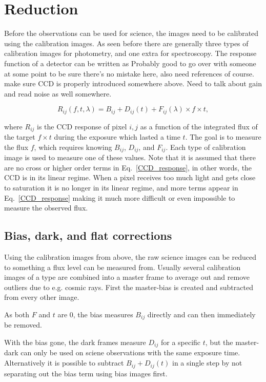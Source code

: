 \documentclass[a4paper,oneside,12pt, class=Latex/Classes/PhDthesisPSnPDF, crop=false]{standalone}
\begin{document}
\section{Reduction}
\label{reduction}
Before the observations can be used for science, the images need to be calibrated using the calibration images. As seen before there are generally three types of calibration images for photometry, and one extra for spectroscopy. The response function of a detector can be written as \color{red} Probably good to go over with someone at some point to be sure there's no mistake here, also need references of course. make sure CCD is properly introduced somewhere above. Need to talk about gain and read noise as well somewhere. \color{black}

\begin{equation}
	R_{ij}(f, t, \lambda) = B_{ij} + D_{ij}(t) + F_{ij}(\lambda) \times f \times t,
	\label{CCD_response}
\end{equation}

where $R_{ij}$ is the CCD response of pixel $i,j$ as a function of the integrated flux of the target $f \times t$ during the exposure which lasted a time $t$. The goal is to measure the flux $f$, which requires knowing $B_{ij}$, $D_{ij}$, and $F_{ij}$. Each type of calibration image is used to measure one of these values. Note that it is assumed that there are no cross or higher order terms in Eq.~\ref{CCD_response}, in other words, the CCD is in its linear regime. When a pixel receives too much light and gets close to saturation it is no longer in its linear regime, and more terms appear in Eq.~\ref{CCD_response} making it much more difficult or even impossible to measure the observed flux.


\subsection{Bias, dark, and flat corrections}
Using the calibration images from above, the raw science images can be reduced to something a flux level can be measured from. Usually several calibration images of a type are combined into a master frame to average out and remove outliers due to e.g. cosmic rays. First the master-bias is created and subtracted from every other image.

As both $F$ and $t$ are 0, the bias measures $B_{ij}$ directly and can then immediately be removed.

With the bias gone, the dark frames measure $D_{ij}$ for a specific $t$, but the master-dark can only be used on sciene observations with the same exposure time. Alternatively it is possible to subtract $B_{ij} + D_{ij}(t)$ in a single step by not separating out the bias term using bias images first.
\end{document}
